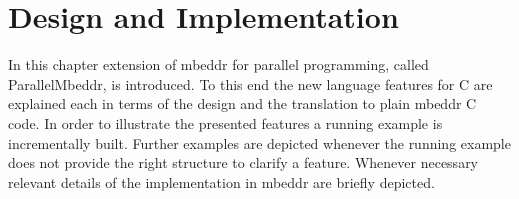 \chapter{Design and Implementation}
In this chapter extension of mbeddr for parallel programming, called ParallelMbeddr, is introduced. To this end the new language features for C are explained each in terms of the design and the translation to plain mbeddr C code. In order to illustrate the presented features a running example is incrementally built. Further examples are depicted whenever the running example does not provide the right structure to clarify a feature.
Whenever necessary relevant details of the implementation in mbeddr are briefly depicted. 


